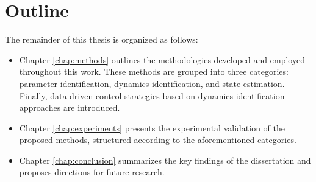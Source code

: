 \section{Outline} 
\label{sec:introduction:outline}

The remainder of this thesis is organized as follows:
\begin{itemize}
    \item Chapter \ref{chap:methods} outlines the methodologies developed and employed throughout this work. These methods are grouped into three categories: parameter identification, dynamics identification, and state estimation. Finally, data-driven control strategies based on dynamics identification approaches are introduced.
    \item Chapter \ref{chap:experiments} presents the experimental validation of the proposed methods, structured according to the aforementioned categories.
    \item Chapter \ref{chap:conclusion} summarizes the key findings of the dissertation and proposes directions for future research.
\end{itemize}
